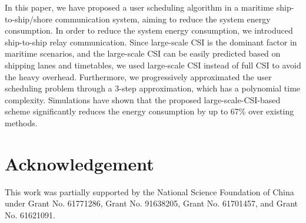 \documentclass[journal]{IEEEtran}
\begin{document}
   In this paper, we have proposed a user scheduling algorithm in a maritime ship-to-ship/shore communication system, aiming to reduce the system energy consumption. 
   In order to reduce the system energy consumption, we introduced ship-to-ship relay communication. 
   Since large-scale CSI is the dominant factor in maritime scenarios, and the large-scale CSI can be easily predicted based on shipping lanes and timetables, we used large-scale CSI instead of full CSI to avoid the heavy overhead. Furthermore, we progressively approximated the user scheduling problem through a 3-step approximation, which has a polynomial time complexity. Simulations have shown that the proposed large-scale-CSI-based scheme significantly reduces the energy consumption by up to 67\% over existing methods.
  
   
  
  
   
   
   \section*{Acknowledgement}
   
   This work was partially supported by the National Science Foundation of China under Grant No. 61771286, Grant No. 91638205, Grant No. 61701457, and Grant No. 61621091. %
   
\end{document}
